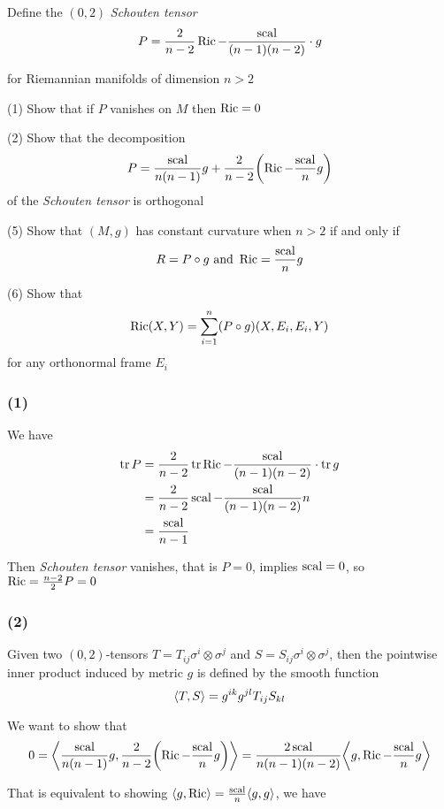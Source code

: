 \begin{problem}[Exercise 3.4.24]
	Define the $(0, 2)$ \textit{Schouten tensor}
	$$
		P = \frac{2}{n-2} \operatorname{Ric} - \frac{\operatorname{scal}}{(n-1)(n-2)} \cdot g
	$$
	
	for Riemannian manifolds of dimension $n > 2$
	
	(1) Show that if $P$ vanishes on $M$ then $\operatorname{Ric} = 0$
	
	(2) Show that the decomposition
	$$
		P = \frac{\scal}{n(n-1)} g + \frac{2}{n-2} \tuple*{\Ric - \frac{\scal}{n} g}
	$$
	of the \textit{Schouten tensor} is orthogonal
	
	(5) Show that $(M, g)$ has constant curvature when $n > 2$ if and only if
	$$
		R = P \circ g \text{ and } \operatorname{Ric} = \frac{\operatorname{scal}}{n} g
	$$
	
	(6) Show that
	$$
		\operatorname{Ric}(X, Y) = \sum_{i=1}^n (P \circ g)(X, E_i, E_i, Y)
	$$
	for any orthonormal frame $E_i$
\end{problem}

\subsubsection{(1)}

We have
\begin{align*}
	\operatorname{tr} P
	&= \frac{2}{n-2} \operatorname{tr} \operatorname{Ric} - \frac{\operatorname{scal}}{(n-1)(n-2)} \cdot \operatorname{tr} g \\
	&= \frac{2}{n-2} \operatorname{scal} - \frac{\operatorname{scal}}{(n-1)(n-2)} n \\
	&= \frac{\operatorname{scal}}{n-1} 
\end{align*}


Then \textit{Schouten tensor} vanishes, that is $P = 0$, implies $\operatorname{scal} = 0$, so $\operatorname{Ric} = \frac{n-2}{2} P = 0$

\subsubsection{(2)}

Given two $(0, 2)$-tensors $T = T_{ij} \sigma^i \otimes \sigma^j$ and $S = S_{ij} \sigma^i \otimes \sigma^j$, then the pointwise inner product induced by metric $g$ is defined by the smooth function
$$
	\langle T, S\rangle = g^{ik} g^{jl} T_{ij} S_{kl}
$$

We want to show that
$$
	0 = \inner*{\frac{\scal}{n(n-1)} g, \frac{2}{n-2} \tuple*{\Ric - \frac{\scal}{n} g}} = \frac{2 \scal}{n(n-1)(n-2)} \inner*{g, \Ric - \frac{\scal}{n} g}
$$

That is equivalent to showing $\langle g, \operatorname{Ric}\rangle = \frac{\operatorname{scal}}{n} \langle g, g\rangle$, we have

